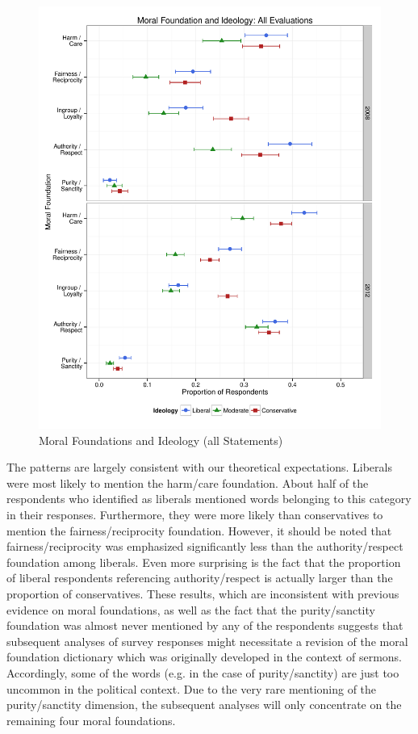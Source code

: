 \documentclass[12pt]{article}
\begin{document}
\begin{figure}\centering
\includegraphics[scale=.4]{../calc/fig/p1_mft_ideol.pdf}
\caption{Moral Foundations and Ideology (all Statements)}\label{fig:mft_ideol}
\end{figure}

The patterns are largely consistent with our theoretical expectations. Liberals were most likely to mention the harm/care foundation. About half of the respondents who identified as liberals mentioned words belonging to this category in their responses. Furthermore, they were more likely than conservatives to mention the fairness/reciprocity foundation. However, it should be noted that fairness/reciprocity was emphasized significantly less than the authority/respect foundation among liberals. Even more surprising is the fact that the proportion of liberal respondents referencing authority/respect is actually larger than the proportion of conservatives. These results, which are inconsistent with previous evidence on moral foundations, as well as the fact that the purity/sanctity foundation was almost never mentioned by any of the respondents suggests that subsequent analyses of survey responses might necessitate a revision of the moral foundation dictionary which was originally developed in the context of sermons. Accordingly, some of the words (e.g. in the case of purity/sanctity) are just too uncommon in the political context. Due to the very rare mentioning of the purity/sanctity dimension, the subsequent analyses will only concentrate on the remaining four moral foundations.
\end{document}
